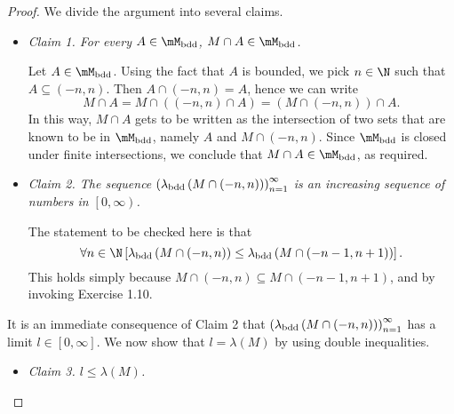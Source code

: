 \documentclass[pmath450]{subfiles}
\begin{document}
    \clearpage
    \begin{proof}
        We divide the argument into several claims.
        \begin{itemize}
            \item \textit{Claim 1. For every $A\in\mM_{\bdd}$, $M\cap A\in\mM_{\bdd}$.}

                \begin{subproof}
                    Let $A\in\mM_{\bdd}$. Using the fact that $A$ is bounded, we pick $n\in\N$ such that $A\subseteq\left( -n,n \right)$. Then $A\cap\left( -n,n \right)=A$, hence we can write
                    \begin{equation*}
                        M\cap A = M\cap\left( \left( -n,n \right)\cap A \right)=\left( M\cap\left( -n,n \right) \right)\cap A.
                    \end{equation*}
                    In this way, $M\cap A$ gets to be written as the intersection of two sets that are known to be in $\mM_{\bdd}$, namely $A$ and $M\cap\left( -n,n \right)$. Since $\mM_{\bdd}$ is closed under finite intersections, we conclude that $M\cap A\in\mM_{\bdd}$, as required.
                \end{subproof}

            \item \textit{Claim 2. The sequence $\left( \lambda_{\operatorname{bdd}}\left( M\cap\left( -n,n \right) \right) \right)^{\infty}_{n=1}$ is an increasing sequence of numbers in $\left[ 0,\infty \right)$.}

                \begin{subproof}
                    The statement to be checked here is that
                    \begin{equation*}
                        \forall n\in\N\left[ \lambda_{\bdd}\left( M\cap\left( -n,n \right) \right)\leq\lambda_{\bdd}\left( M\cap \left( -n-1,n+1 \right) \right) \right].
                    \end{equation*}
                    This holds simply because $M\cap\left( -n,n \right)\subseteq M\cap\left( -n-1,n+1 \right)$, and by invoking Exercise 1.10.
                \end{subproof}
        \end{itemize} 
        It is an immediate consequence of Claim 2 that $\left( \lambda_{\operatorname{bdd}}\left( M\cap\left( -n,n \right) \right) \right)^{\infty}_{n=1}$ has a limit $l\in\left[ 0,\infty \right]$. We now show that $l=\lambda\left( M \right)$ by using double inequalities.
        \begin{itemize}
            \item \textit{Claim 3. $l\leq\lambda\left( M \right)$.}


\end{itemize}
\end{proof}
\end{document}
